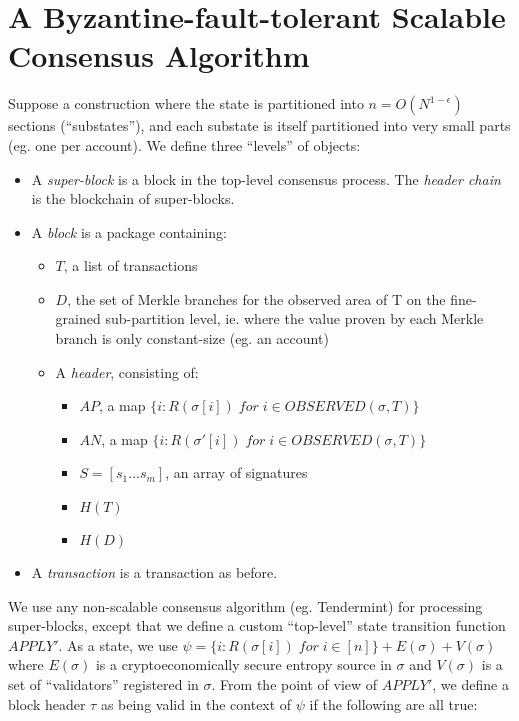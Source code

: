 \documentclass[11pt,a4paper]{report}
\theoremstyle{plain}
\theoremstyle{definition}
\theoremstyle{remark}
\begin{document}
\chapter{A Byzantine-fault-tolerant Scalable Consensus Algorithm}

Suppose a construction where the state is partitioned into $n = O(N^{1-\epsilon})$ sections (``substates''), and each substate is itself partitioned into very small parts (eg. one per account). We define three ``levels'' of objects:

\begin{itemize}
\item
A \emph{super-block} is a block in the top-level consensus process. The \emph{header chain} is the blockchain of super-blocks.
\item
A \emph{block} is a package containing:

    \begin{itemize}
    \item
    $T$, a list of transactions
    \item
    $D$, the set of Merkle branches for the observed area of T on the fine-grained sub-partition level, ie. where the value proven by each Merkle branch is only constant-size (eg. an account)
    \item
    A \emph{header}, consisting of:
        \begin{itemize}
        \item
        $AP$, a map $\{i: R(\sigma[i]) \; for \; i \in OBSERVED(\sigma, T)\}$
        \item
        $AN$, a map $\{i: R(\sigma'[i]) \; for \; i \in OBSERVED(\sigma, T)\}$
        \item
        $S = [s_1 ... s_m]$, an array of signatures
        \item
        $H(T)$
        \item
        $H(D)$
        \end{itemize}
    \end{itemize}
\item
A \emph{transaction} is a transaction as before.
\end{itemize}

We use any non-scalable consensus algorithm (eg. Tendermint) for processing super-blocks, except that we define a custom ``top-level'' state transition function $APPLY'$. As a state, we use $\psi = \{i: R(\sigma[i]) \; for \; i \in [n]\} + E(\sigma) + V(\sigma)$ where $E(\sigma)$ is a cryptoeconomically secure entropy source in $\sigma$ and $V(\sigma)$ is a set of ``validators'' registered in $\sigma$. From the point of view of $APPLY'$, we define a block header $\tau$ as being valid in the context of $\psi$ if the following are all true:
\end{document}
